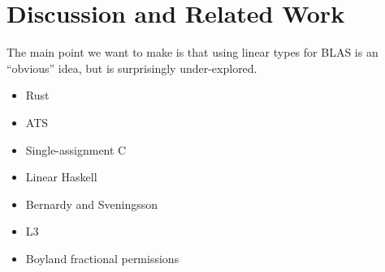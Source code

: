 \section{Discussion and Related Work}

The main point we want to make is that using linear types for BLAS
is an ``obvious'' idea, but is surprisingly under-explored. 

\begin{itemize}
\item Rust
\item ATS
\item Single-assignment C 
\item Linear Haskell
\item Bernardy and Sveningsson
\item L3
\item Boyland fractional permissions
\end{itemize}

